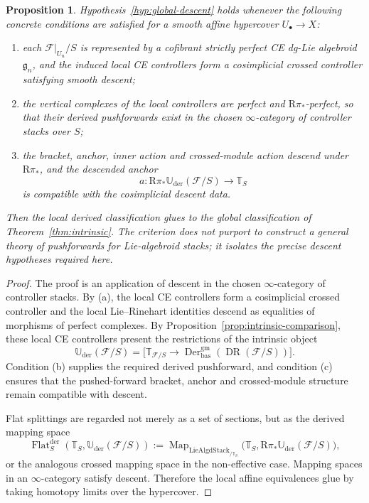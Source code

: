 \documentclass[11pt,reqno,a4paper,dvipsnames,x11names]{amsart}
\numberwithin{equation}{section}
\theoremstyle{plain}
\newtheorem{proposition}[theorem]{Proposition}
\theoremstyle{definition}
\theoremstyle{remark}
\DeclareMathOperator{\Der}{Der}
\DeclareMathOperator{\DR}{DR}
\DeclareMathOperator{\Map}{Map}
\newcommand{\cF}{\mathcal F}
\newcommand{\g}{\mathfrak g}
\newcommand{\Uder}{\mathbb U_{\mathrm{der}}}
\newcommand{\bbT}{\mathbb T}
\newcommand{\gm}{\mathrm{gm}}
\newcommand{\bas}{\mathrm{bas}}
\newcommand{\from}{\colon}
\begin{document}
\begin{proposition} \label{prop:checkable-global-descent}
Hypothesis~\ref{hyp:global-descent} holds whenever the following concrete conditions are satisfied for a smooth affine hypercover \(U_\bullet\to X\):
\begin{enumerate}[label=(\alph*)]
\item each \(\cF|_{U_n}/S\) is represented by a cofibrant strictly perfect CE dg-Lie algebroid \(\g_n\), and the induced local CE controllers form a cosimplicial crossed controller satisfying smooth descent;
\item the vertical complexes of the local controllers are perfect and \(\mathrm R\pi_*\)-perfect, so that their derived pushforwards exist in the chosen \(\infty\)-category of controller stacks over \(S\);
\item the bracket, anchor, inner action and crossed-module action descend under \(\mathrm R\pi_*\), and the descended anchor
\[
 a\from \mathrm R\pi_*\Uder(\cF/S)\longrightarrow \bbT_S
\]
is compatible with the cosimplicial descent data.
\end{enumerate}
Then the local derived classification glues to the global classification of Theorem~\ref{thm:intrinsic}. The criterion does not purport to construct a general theory of pushforwards for Lie-algebroid stacks; it isolates the precise descent hypotheses required here.
\end{proposition}

\begin{proof}
The proof is an application of descent in the chosen \(\infty\)-category of controller stacks. By (a), the local CE controllers form a cosimplicial crossed controller and the local Lie--Rinehart identities descend as equalities of morphisms of perfect complexes. By Proposition~\ref{prop:intrinsic-comparison}, these local CE controllers present the restrictions of the intrinsic object
\[
 \Uder(\cF/S)=
 \bigl[\bbT_{\cF/S}\to\Der^{\gm}_{\bas}(\DR(\cF/S))\bigr].
\]
Condition (b) supplies the required derived pushforward, and condition (c) ensures that the pushed-forward bracket, anchor and crossed-module structure remain compatible with descent.

Flat splittings are regarded not merely as a set of sections, but as the derived mapping space
\[
 \operatorname{Flat}^{\mathrm{der}}_S(\bbT_S,\Uder(\cF/S))
 :=
 \Map_{\mathrm{LieAlgdStack}_{/\bbT_S}}
 \bigl(\bbT_S,\mathrm R\pi_*\Uder(\cF/S)\bigr),
\]
or the analogous crossed mapping space in the non-effective case. Mapping spaces in an \(\infty\)-category satisfy descent. Therefore the local affine equivalences glue by taking homotopy limits over the hypercover.
\end{proof}
\end{document}
